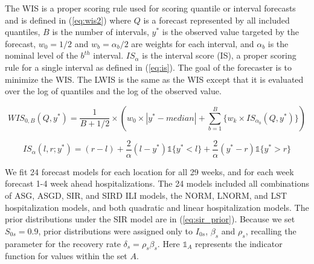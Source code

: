 \documentclass[ba]{imsart}
\theoremstyle{plain}
\theoremstyle{definition}
\theoremstyle{remark}
\begin{document}
The WIS is a proper scoring rule used for scoring quantile or interval forecasts \cite[]{gneiting2007strictly, gneiting2014probabilistic, bracher2021evaluating} and is defined in (\ref{eq:wis2}) where $Q$ is a forecast represented by all included quantiles, $B$ is the number of intervals,  $y^*$ is the observed value targeted by the forecast, $w_0 = 1/2$ and $w_b = \alpha_b / 2$ are weights for each interval, and $\alpha_b$ is the nominal level of the $b^{th}$ interval. $IS_{\alpha}$ is the interval score (IS), a proper scoring rule for a single interval as defined in (\ref{eq:is}). The goal of the forecaster is to minimize the WIS. The LWIS is the same as the WIS except that it is evaluated over the log of quantiles and the log of the observed value. 

\begin{equation}
\label{eq:wis2}
        WIS_{0,B}(Q, y^*) = \frac{1}{B + 1/2} \times (w_0\times |y^* - median| + \sum_{b=1}^B \{w_k \times IS_{\alpha_b}(Q, y^*) \} )
\end{equation}

\begin{equation}
\label{eq:is}
        IS_{\alpha}(l,r;y^*) = (r-l) + \frac{2}{\alpha}(l - y^*)\mathbb{1}\{y^* < l\} + \frac{2}{\alpha}(y^* - r) \mathbb{1}\{y^* > r\}
\end{equation}


We fit 24 forecast models for each location for all 29 weeks, and for each week forecast 1-4 week ahead hospitalizations. The 24 models included all combinations of ASG, ASGD, SIR, and SIRD ILI models, the NORM, LNORM, and LST hospitalization models, and both quadratic and linear hospitalization models. 
The prior distributions under the SIR model are in (\ref{eq:sir_prior}). Because we set $S_{0s} = 0.9$, prior distributions were assigned only to $I_{0s}$, $\beta_s$ and $\rho_s$, recalling the parameter for the recovery rate $\delta_s = \rho_s \beta_s$. Here $\mathbb{1}_{A}$ represents the indicator function for values within the set $A$.
\end{document}
